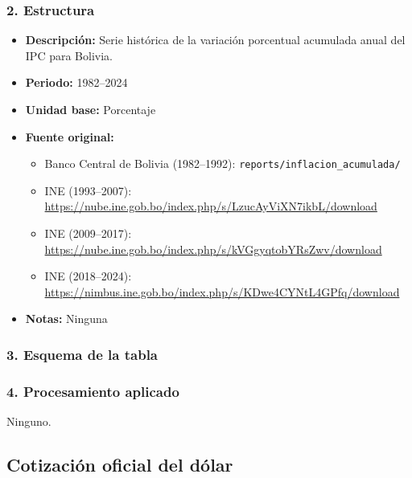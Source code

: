\documentclass[12pt,a4paper]{article}
\begin{document}
\subsubsection*{2. Estructura}
\begin{itemize}
  \item \textbf{Descripción:} Serie histórica de la variación porcentual acumulada anual del IPC para Bolivia.
  \item \textbf{Periodo:} 1982–2024
  \item \textbf{Unidad base:} Porcentaje
  \item \textbf{Fuente original:}
    \begin{itemize}
      \item Banco Central de Bolivia (1982–1992): \texttt{reports/inflacion\_acumulada/}
      \item INE (1993–2007): \url{https://nube.ine.gob.bo/index.php/s/LzucAyViXN7ikbL/download}
      \item INE (2009–2017): \url{https://nube.ine.gob.bo/index.php/s/kVGgyqtobYRsZwv/download}
      \item INE (2018–2024): \url{https://nimbus.ine.gob.bo/index.php/s/KDwe4CYNtL4GPfq/download}
    \end{itemize}
  \item \textbf{Notas:} Ninguna
\end{itemize}

\subsubsection*{3. Esquema de la tabla}

\subsubsection*{4. Procesamiento aplicado}
Ninguno.

\subsection{Cotización oficial del dólar}
\end{document}
